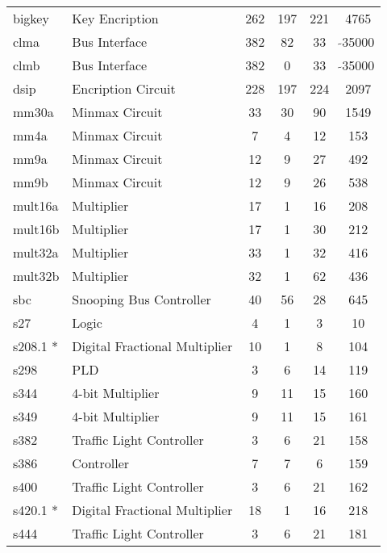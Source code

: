 {\begin{pespace}
\begin{center}
\begin{tabular}{|l|l|c|c|c|c|}
bigkey  & Key Encription            & 262    & 197    & 221   &  4765 \\
clma    & Bus Interface             & 382    & 82     & 33    &$\tilde{}$35000\\
clmb    & Bus Interface             & 382    & 0      & 33    &$\tilde{}$35000\\
dsip    & Encription Circuit        & 228    & 197    & 224   &  2097 \\
mm30a   & Minmax Circuit            & 33     & 30     & 90    &  1549 \\
mm4a    & Minmax Circuit            & 7      & 4      & 12    &   153 \\
mm9a    & Minmax Circuit            & 12     & 9      & 27    &   492 \\
mm9b    & Minmax Circuit            & 12     & 9      & 26    &   538 \\
mult16a & Multiplier                & 17     & 1      & 16    &   208 \\
mult16b & Multiplier                & 17     & 1      & 30    &   212 \\
mult32a & Multiplier                & 33     & 1      & 32    &   416 \\
mult32b & Multiplier                & 32     & 1      & 62    &   436 \\
sbc     & Snooping Bus Controller   & 40     & 56     & 28    &   645 \\
s27	& Logic                     & 4      & 1      & 3     &    10 \\
s208.1 *& Digital Fractional Multiplier & 10 & 1      & 8     &   104 \\
s298    & PLD                       & 3      & 6      & 14    &   119 \\
s344	& 4-bit Multiplier          & 9      & 11     & 15    &   160 \\
s349    & 4-bit Multiplier          & 9      & 11     & 15    &   161 \\
s382    & Traffic Light Controller  & 3      & 6      & 21    &   158 \\
s386    & Controller                & 7      & 7      & 6     &   159 \\
s400    & Traffic Light Controller  & 3      & 6      & 21    &   162 \\
s420.1 *& Digital Fractional Multiplier & 18 & 1      & 16    &   218 \\
s444    & Traffic Light Controller  & 3      & 6      & 21    &   181 \\

\end{tabular}
\end{center}
\end{pespace}}

